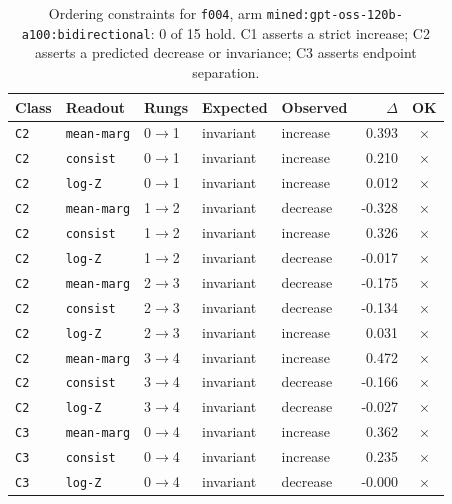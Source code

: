 \documentclass[11pt]{article}
\begin{document}
\begin{table}[htbp]
\centering
\small
\caption{Ordering constraints for \texttt{f004}, arm \texttt{mined:gpt-oss-120b-a100:bidirectional}: 0 of 15 hold. C1 asserts a strict increase; C2 asserts a predicted decrease or invariance; C3 asserts endpoint separation.}
\label{tab:ladder-f004-mined-gpt-oss-120b-a100-bidirectional}
\begin{tabular}{lllllrc}
\toprule
Class & Readout & Rungs & Expected & Observed & $\Delta$ & OK \\
\midrule
\texttt{C2} & \texttt{mean-marg} & 0$\to$1 & invariant & increase & 0.393 & $\times$ \\
\texttt{C2} & \texttt{consist} & 0$\to$1 & invariant & increase & 0.210 & $\times$ \\
\texttt{C2} & \texttt{log-Z} & 0$\to$1 & invariant & increase & 0.012 & $\times$ \\
\texttt{C2} & \texttt{mean-marg} & 1$\to$2 & invariant & decrease & -0.328 & $\times$ \\
\texttt{C2} & \texttt{consist} & 1$\to$2 & invariant & increase & 0.326 & $\times$ \\
\texttt{C2} & \texttt{log-Z} & 1$\to$2 & invariant & decrease & -0.017 & $\times$ \\
\texttt{C2} & \texttt{mean-marg} & 2$\to$3 & invariant & decrease & -0.175 & $\times$ \\
\texttt{C2} & \texttt{consist} & 2$\to$3 & invariant & decrease & -0.134 & $\times$ \\
\texttt{C2} & \texttt{log-Z} & 2$\to$3 & invariant & increase & 0.031 & $\times$ \\
\texttt{C2} & \texttt{mean-marg} & 3$\to$4 & invariant & increase & 0.472 & $\times$ \\
\texttt{C2} & \texttt{consist} & 3$\to$4 & invariant & decrease & -0.166 & $\times$ \\
\texttt{C2} & \texttt{log-Z} & 3$\to$4 & invariant & decrease & -0.027 & $\times$ \\
\texttt{C3} & \texttt{mean-marg} & 0$\to$4 & invariant & increase & 0.362 & $\times$ \\
\texttt{C3} & \texttt{consist} & 0$\to$4 & invariant & increase & 0.235 & $\times$ \\
\texttt{C3} & \texttt{log-Z} & 0$\to$4 & invariant & decrease & -0.000 & $\times$ \\
\bottomrule
\end{tabular}
\end{table}
\end{document}
